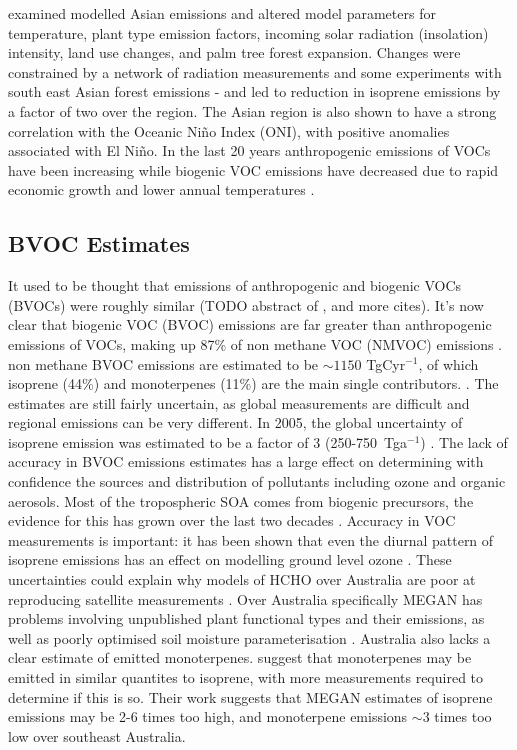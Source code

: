     \citet{Stavrakou2014} examined modelled Asian emissions and altered model parameters for temperature, plant type emission factors, incoming solar radiation (insolation) intensity, land use changes, and palm tree forest expansion.
    Changes were constrained by a network of radiation measurements and some experiments with south east Asian forest emissions - and led to reduction in isoprene emissions by a factor of two over the region.
    The Asian region is also shown to have a strong correlation with the Oceanic Niño Index (ONI), with positive anomalies associated with El Niño.
    In the last 20 years anthropogenic emissions of VOCs have been increasing while biogenic VOC emissions have decreased due to rapid economic growth and lower annual temperatures \citep{Stavrakou2014, Kwon2017}.
    
  \subsection{BVOC Estimates}
  \label{ch_LitRev:sec:BVOCestimates}
    It used to be thought that emissions of anthropogenic and biogenic VOCs (BVOCs) were roughly similar (TODO abstract of \citep{Mueller1992}, and more cites).
    It's now clear that biogenic VOC (BVOC) emissions are far greater than anthropogenic emissions of VOCs, making up 87\% of non methane VOC (NMVOC) emissions \citep{Kanakidou2005, Kefauver2014}.
    non methane BVOC emissions are estimated to be $\sim1150$ TgCyr$^{-1}$, of which isoprene (44\%) and monoterpenes (11\%) are the main single contributors. \citep{Guenther2000, Kefauver2014}. 
    The estimates are still fairly uncertain, as global measurements are difficult and regional emissions can be very different. 
    In 2005, %
    the global uncertainty of isoprene emission was estimated to be a factor of 3 (250-750~Tga$^{-1}$) \citep{Kanakidou2005}.
    The lack of accuracy in BVOC emissions estimates has a large effect on determining with confidence the sources and distribution of pollutants including ozone and organic aerosols.
    Most of the tropospheric SOA comes from biogenic precursors, the evidence for this has grown over the last two decades \citep{Guenther1995, Kanakidou2005,Guenther2012}.
    Accuracy in VOC measurements is important: it has been shown that even the diurnal pattern of isoprene emissions has an effect on modelling ground level ozone \citep{Hewitt2011,Fan2004}.
    These uncertainties could explain why models of HCHO over Australia are poor at reproducing satellite measurements \citep{Stavrakou2009}.
    Over Australia specifically MEGAN has problems involving unpublished plant functional types and their emissions, as well as poorly optimised soil moisture parameterisation \citep{Emmerson2016}.
    Australia also lacks a clear estimate of emitted monoterpenes.
    \cite{Emmerson2016} suggest that monoterpenes may be emitted in similar quantites to isoprene, with more measurements required to determine if this is so.
    Their work suggests that MEGAN estimates of isoprene emissions may be 2-6 times too high, and monoterpene emissions $\sim3$ times too low over southeast Australia.

